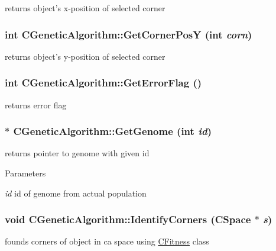 \label{classCGeneticAlgorithm_a7ed37537336f7ba8c77b8944e0a9052a}
returns object's x-\/position of selected corner \hypertarget{classCGeneticAlgorithm_afff003459489277c5b3944677b589a2b}{
\subsubsection[{GetCornerPosY}]{\setlength{\rightskip}{0pt plus 5cm}int CGeneticAlgorithm::GetCornerPosY (int {\em corn})}}
\label{classCGeneticAlgorithm_afff003459489277c5b3944677b589a2b}
returns object's y-\/position of selected corner \hypertarget{classCGeneticAlgorithm_a73bfc748e3d504395e6180d363a24536}{
\subsubsection[{GetErrorFlag}]{\setlength{\rightskip}{0pt plus 5cm}int CGeneticAlgorithm::GetErrorFlag ()}}
\label{classCGeneticAlgorithm_a73bfc748e3d504395e6180d363a24536}
returns error flag \hypertarget{classCGeneticAlgorithm_a85a3227b126b529d21b503e48fcf30ef}{
\subsubsection[{GetGenome}]{ $\ast$ CGeneticAlgorithm::GetGenome (int {\em id})}}
\label{classCGeneticAlgorithm_a85a3227b126b529d21b503e48fcf30ef}
returns pointer to genome with given id


\begin{DoxyParams}{Parameters}
\item[{\em id}]id of genome from actual population \end{DoxyParams}
\hypertarget{classCGeneticAlgorithm_ad11b5c30a2eb45b1a8526ef058b1c8d0}{
\subsubsection[{IdentifyCorners}]{\setlength{\rightskip}{0pt plus 5cm}void CGeneticAlgorithm::IdentifyCorners ({\bf CSpace} $\ast$ {\em s})}}
\label{classCGeneticAlgorithm_ad11b5c30a2eb45b1a8526ef058b1c8d0}
founds corners of object in ca space using \hyperlink{classCFitness}{CFitness} class


